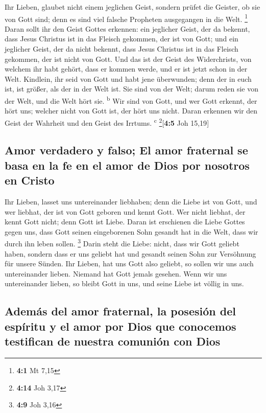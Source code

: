  Ihr Lieben, glaubet nicht einem jeglichen Geist, sondern
prüfet die Geister, ob sie von Gott sind; denn es sind viel falsche
Propheten ausgegangen in die Welt. \footnote{\textbf{4:1} Mt 7,15}
 Daran sollt ihr den Geist Gottes erkennen: ein jeglicher
Geist, der da bekennt, dass Jesus Christus ist in das Fleisch gekommen,
der ist von Gott;  und ein jeglicher Geist, der da nicht
bekennt, dass Jesus Christus ist in das Fleisch gekommen, der ist nicht
von Gott. Und das ist der Geist des Widerchrists, von welchem ihr habt
gehört, dass er kommen werde, und er ist jetzt schon in der Welt.
 Kindlein, ihr seid von Gott und habt jene überwunden;
denn der in euch ist, ist größer, als der in der Welt ist.
 Sie sind von der Welt; darum reden sie von der Welt, und
die Welt hört sie. \textsuperscript{b}  Wir sind von Gott,
und wer Gott erkennt, der hört uns; welcher nicht von Gott ist, der hört
uns nicht. Daran erkennen wir den Geist der Wahrheit und den Geist des
Irrtums. \textsuperscript{c} \footnote{\textbf{4:14} Joh 3,17}{[}\textbf{4:5}
Joh 15,19{]}

\hypertarget{amor-verdadero-y-falso-el-amor-fraternal-se-basa-en-la-fe-en-el-amor-de-dios-por-nosotros-en-cristo}{%
\subsection{Amor verdadero y falso; El amor fraternal se basa en la fe
en el amor de Dios por nosotros en
Cristo}\label{amor-verdadero-y-falso-el-amor-fraternal-se-basa-en-la-fe-en-el-amor-de-dios-por-nosotros-en-cristo}}

 Ihr Lieben, lasset uns untereinander liebhaben; denn die
Liebe ist von Gott, und wer liebhat, der ist von Gott geboren und kennt
Gott.  Wer nicht liebhat, der kennt Gott nicht; denn Gott
ist Liebe.  Daran ist erschienen die Liebe Gottes gegen
uns, dass Gott seinen eingeborenen Sohn gesandt hat in die Welt, dass
wir durch ihn leben sollen. \footnote{\textbf{4:9} Joh 3,16}
 Darin steht die Liebe: nicht, dass wir Gott geliebt
haben, sondern dass er uns geliebt hat und gesandt seinen Sohn zur
Versöhnung für unsere Sünden.  Ihr Lieben, hat uns Gott
also geliebt, so sollen wir uns auch untereinander lieben.
 Niemand hat Gott jemals gesehen. Wenn wir uns
untereinander lieben, so bleibt Gott in uns, und seine Liebe ist völlig
in uns.

\hypertarget{ademuxe1s-del-amor-fraternal-la-posesiuxf3n-del-espuxedritu-y-el-amor-por-dios-que-conocemos-testifican-de-nuestra-comuniuxf3n-con-dios}{%
\subsection{Además del amor fraternal, la posesión del espíritu y el
amor por Dios que conocemos testifican de nuestra comunión con
Dios}\label{ademuxe1s-del-amor-fraternal-la-posesiuxf3n-del-espuxedritu-y-el-amor-por-dios-que-conocemos-testifican-de-nuestra-comuniuxf3n-con-dios}}

